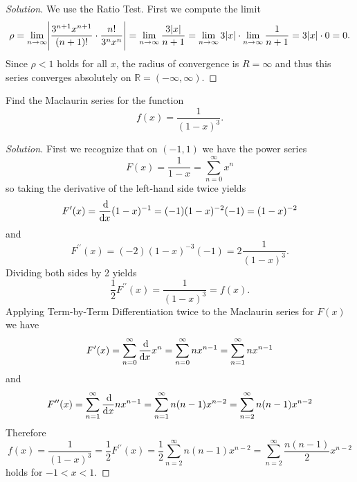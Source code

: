 \documentclass[12pt]{amsart}
\begin{document}
\begin{proof}[Solution]
  We use the Ratio Test.
  First we compute the limit
  \[\rho 
  = \lim_{n \to \infty} \abs{\frac{3^{n+1}x^{n+1}}{(n+1)!} \cdot \frac{n!}{3^nx^n}}
  = \lim_{n \to \infty} \frac{3\abs{x}}{n + 1}
  = \lim_{n \to \infty} 3\abs{x} \cdot \lim_{n \to \infty} \frac{1}{n+1} = 3\abs{x} \cdot 0 = 0.\]
  Since \(\rho < 1\) holds for all \(x\), the radius of convergence is \(R = \infty\) and thus this series converges absolutely on \(\mathbb{R} = (-\infty,\infty)\).
\end{proof}

\begin{thm}[25 Points]
  Find the Maclaurin series for the function
  \[f(x) = \frac{1}{(1-x)^3}.\]
\end{thm}

\begin{proof}[Solution]
  First we recognize that on \((-1,1)\) we have the power series
  \[F(x) = \frac{1}{1-x} = \sum_{n = 0}^\infty x^n\]
  so taking the derivative of the left-hand side twice yields
  \[F^\prime(x) = \frac{\dif }{\dif x} (1 - x)^{-1}
  = (-1)(1 - x)^{-2}(-1)
  = (1 - x)^{-2}\]
  and
  \[
  F^{\prime\prime}(x) = (-2)(1 - x)^{-3}(-1)
  = 2\frac{1}{(1 - x)^3}.
  \]
  Dividing both sides by 2 yields
  \[\frac{1}{2}F^{\prime\prime}(x) = \frac{1}{(1 - x)^3} = f(x).\]
  Applying Term-by-Term Differentiation twice to the Maclaurin series for \(F(x)\) we have
  \[F^\prime(x) = \sum_{n = 0}^\infty \frac{\dif}{\dif x}x^n = \sum_{n = 0}^\infty nx^{n-1} = \sum_{n = 1}^\infty nx^{n-1}\]
  and
  \[F^{\prime\prime}(x) = \sum_{n = 1}^\infty \frac{\dif}{\dif x} nx^{n-1}
  = \sum_{n = 1}^\infty n(n-1)x^{n-2}
  = \sum_{n = 2}^\infty n(n-1)x^{n-2}\]
  Therefore
  \[f(x) = \frac{1}{(1 - x)^3} =\frac{1}{2}F^{\prime\prime}(x)
  = \frac{1}{2}\sum_{n = 2}^\infty n(n-1)x^{n-2}
  = \sum_{n = 2}^\infty \frac{n(n-1)}{2}x^{n-2}\]
  holds for \(-1 < x < 1\).
\end{proof}
\end{document}
